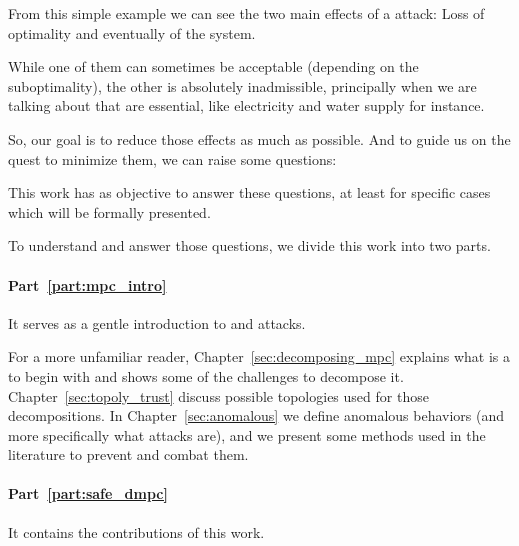\documentclass[../main.tex]{subfiles}
\begin{document}
From this simple example we can see the two main effects of a attack: Loss of optimality and eventually  of the system.

While one of them can sometimes be acceptable (depending on the suboptimality), the other is absolutely inadmissible, principally when we are talking about \cps{} that are essential, like electricity and water supply for instance.

So, our goal is to reduce those effects as much as possible.
And to guide us on the quest to minimize them, we can raise some questions:

This work has as objective to answer these questions, at least for specific cases which will be formally presented.

To understand and answer those questions, we divide this work into two parts.

\paragraph{Part~\ref{part:mpc_intro}} It serves as a gentle introduction to \dmpc{} and attacks.

For a more unfamiliar reader, Chapter~\ref{sec:decomposing_mpc} explains what is a \mpc{} to begin with and shows some of the challenges to decompose it.
Chapter~\ref{sec:topoly_trust} discuss possible topologies used for those decompositions.
In Chapter~\ref{sec:anomalous} we define anomalous behaviors (and more specifically what attacks are), and we present some methods used in the literature to prevent and combat them.

\paragraph{Part~\ref{part:safe_dmpc}} It contains the contributions of this work.
\end{document}
